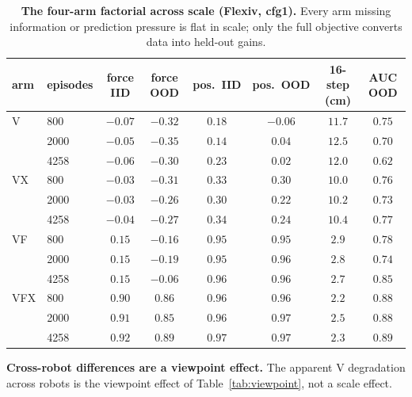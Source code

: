 \documentclass{article} %
\begin{document}
\begin{table}[H]
\caption{\textbf{The four-arm factorial across scale (Flexiv, cfg1).} Every arm missing information or prediction pressure is flat in scale; only the full objective converts data into held-out gains.}
\label{tab:cfg1}
\begin{center}
\small
\begin{tabular}{llcccccc}
\toprule
\rowcolor{tabhead} arm & episodes & force IID & force OOD & pos.\ IID & pos.\ OOD & 16-step (cm) & AUC OOD \\
\midrule
V & 800 & $-0.07$ & $-0.32$ & $0.18$ & $-0.06$ & $11.7$ & $0.75$ \\
 & 2000 & $-0.05$ & $-0.35$ & $0.14$ & $0.04$ & $12.5$ & $0.70$ \\
 & 4258 & $-0.06$ & $-0.30$ & $0.23$ & $0.02$ & $12.0$ & $0.62$ \\
\midrule
VX & 800 & $-0.03$ & $-0.31$ & $0.33$ & $0.30$ & $10.0$ & $0.76$ \\
 & 2000 & $-0.03$ & $-0.26$ & $0.30$ & $0.22$ & $10.2$ & $0.73$ \\
 & 4258 & $-0.04$ & $-0.27$ & $0.34$ & $0.24$ & $10.4$ & $0.77$ \\
\midrule
VF & 800 & $0.15$ & $-0.16$ & $0.95$ & $0.95$ & $2.9$ & $0.78$ \\
 & 2000 & $0.15$ & $-0.19$ & $0.95$ & $0.96$ & $2.8$ & $0.74$ \\
 & 4258 & $0.15$ & $-0.06$ & $0.96$ & $0.96$ & $2.7$ & $0.85$ \\
\midrule
\rowcolor{tabours} VFX & 800 & $0.90$ & $0.86$ & $0.96$ & $0.96$ & $2.2$ & $0.88$ \\
\rowcolor{tabours}  & 2000 & $0.91$ & $0.85$ & $0.96$ & $0.97$ & $2.5$ & $0.88$ \\
\rowcolor{tabours}  & 4258 & $0.92$ & $0.89$ & $0.97$ & $0.97$ & $2.3$ & $0.89$ \\
\bottomrule
\end{tabular}
\end{center}
\end{table}

\textbf{Cross-robot differences are a viewpoint effect.} The apparent
V degradation across robots is the viewpoint effect of Table~\ref{tab:viewpoint}, not a scale effect.
\end{document}
